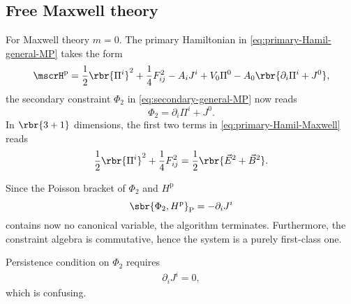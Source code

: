 \documentclass[a4paper,11pt]{article}
\begin{document}
\subsection{Free Maxwell theory}

For Maxwell theory $m = 0$. The primary Hamiltonian in 
\cref{eq:primary-Hamil-general-MP} takes the form
\begin{equation}
\mscrH^\text{p} = \frac{1}{2} \rbr{\Pi^i}^2 + \frac{1}{4} F_{ij}^2 - A_i J^i
+V_0 \Pi^0 - A_0 \rbr{\partial_i \Pi^i + J^0},
\label{eq:primary-Hamil-Maxwell}
\end{equation}
the secondary constraint $\Phi_2$ in \cref{eq:secondary-general-MP} now 
reads
\begin{equation}
\Phi_2 = \partial_i \Pi^i + J^0.
\end{equation}
In $\rbr{3+1}$ dimensions, the first two terms in 
\cref{eq:primary-Hamil-Maxwell} reads
\begin{equation}
\frac{1}{2}\rbr{\Pi^i}^2 + \frac{1}{4}F_{ij}^2 =
\frac{1}{2}\rbr{\vec E^2 + \vec B^2}.
\end{equation}


Since the Poisson bracket of $\Phi_2$ and $H^\text{p}$
\begin{equation}
\sbr{\Phi_2, H^\text{p}}_\text{P} = -\partial_i J^i
\end{equation}
contains now no canonical variable, the algorithm terminates. Furthermore, 
the constraint algebra is commutative, hence the system is a purely 
first-class one.

Persistence condition on $\Phi_2$ requires
\begin{align}
\partial_i J^i = 0,
\end{align}
which is confusing. 


\printbibliography
\end{document}
